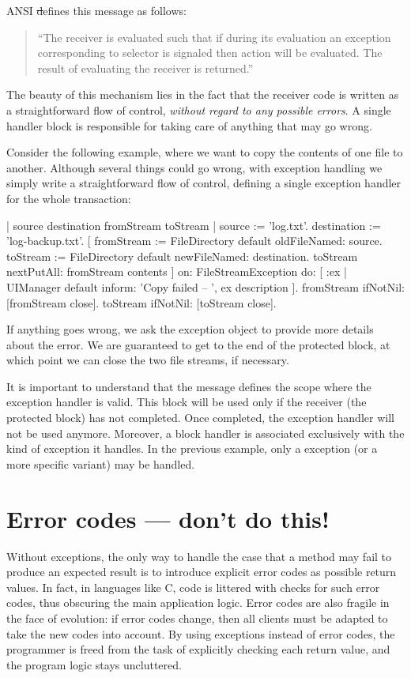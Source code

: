 \documentclass[a4paper,10pt,twoside]{book}
\begin{document}
ANSI \st defines this message as follows:
\begin{quote}
``The receiver is evaluated such that if during its evaluation an exception corresponding to selector is signaled then action will be evaluated. The result of evaluating the receiver is returned.''
\end{quote}

The beauty of this mechanism lies in the fact that the receiver code is written as a straightforward flow of control, \emph{without regard to any possible errors}. A single handler block is responsible for taking care of anything that may go wrong.

Consider the following example, where we want to copy the contents of one file to another.
Although several things could go wrong, with exception handling we simply write a straightforward flow of control, defining a single exception handler for the whole transaction:
\begin{code}{| source destination fromStream toStream |}
source := 'log.txt'.
destination := 'log-backup.txt'.
[	fromStream := FileDirectory default oldFileNamed: source.
	toStream := FileDirectory default newFileNamed: destination.
	toStream nextPutAll: fromStream contents
]
	on: FileStreamException
	do: [ :ex | UIManager default inform: 'Copy failed -- ', ex description ].
fromStream ifNotNil: [fromStream close].
toStream ifNotNil: [toStream close].
\end{code}
If anything goes wrong, we ask the exception object to provide more details about the error.
We are guaranteed to get to the end of the protected block, at which point we can close the two file streams, if necessary.

It is important to understand  that the message  defines the scope where the exception handler is valid. This block will be used only if the receiver (\ie the protected block) has not completed. Once completed, the exception handler will not be used anymore. Moreover, a block handler is associated exclusively with the kind of exception it handles. In the previous example, only a  exception (or a more specific variant) may be handled.

\section{Error codes --- don't  do this!}

Without exceptions, the only way to handle the case that a method may fail to produce an expected result is to introduce explicit error codes as possible return values. In fact, in languages like C, code is littered with checks for such error codes, thus obscuring the main application logic.
Error codes are also fragile in the face of evolution: if error codes change, then all clients must be adapted to take the new codes into account. By using exceptions instead of error codes, the programmer is freed from the task of explicitly checking each return value, and the program logic stays uncluttered.
\end{document}
